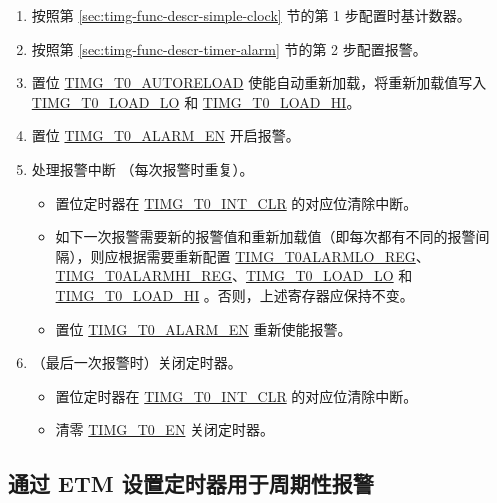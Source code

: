 \documentclass[main\_\_CN.tex]{subfiles}
\begin{document}
\begin{enumerate}
    \item 按照第 \ref{sec:timg-func-descr-simple-clock} 节的第 1 步配置时基计数器。
    \item 按照第 \ref{sec:timg-func-descr-timer-alarm} 节的第 2 步配置报警。
    \item 置位 \hyperref[fielddesc:TIMGTXAUTORELOAD]{TIMG\_T0\_AUTORELOAD} 使能自动重新加载，将重新加载值写入 \hyperref[fielddesc:TIMGTXLOADLO]{TIMG\_T0\_LOAD\_LO} 和 \hyperref[fielddesc:TIMGTXLOADHI]{TIMG\_T0\_LOAD\_HI}。
    \item 置位 \hyperref[fielddesc:TIMGTXALARMEN]{TIMG\_T0\_ALARM\_EN} 开启报警。
    \item 处理报警中断 （每次报警时重复）。
    \begin{itemize}
        \item 置位定时器在 \hyperref[fielddesc:TIMGT0INTCLR]{TIMG\_T0\_INT\_CLR} 的对应位清除中断。
        \item 如下一次报警需要新的报警值和重新加载值（即每次都有不同的报警间隔），则应根据需要重新配置 \hyperref[regdesc:TIMGTXALARMLOREG]{TIMG\_T0ALARMLO\_REG}、\hyperref[regdesc:TIMGTXALARMHIREG]{TIMG\_T0ALARMHI\_REG}、\hyperref[fielddesc:TIMGTXLOADLO]{TIMG\_T0\_LOAD\_LO} 和 \hyperref[fielddesc:TIMGTXLOADHI]{TIMG\_T0\_LOAD\_HI} 。否则，上述寄存器应保持不变。
        \item 置位 \hyperref[fielddesc:TIMGTXALARMEN]{TIMG\_T0\_ALARM\_EN} 重新使能报警。
    \end{itemize}
    \item （最后一次报警时）关闭定时器。
    \begin{itemize}
        \item 置位定时器在 \hyperref[fielddesc:TIMGT0INTCLR]{TIMG\_T0\_INT\_CLR} 的对应位清除中断。
        \item 清零 \hyperref[fielddesc:TIMGTXEN]{TIMG\_T0\_EN} 关闭定时器。
    \end{itemize}
\end{enumerate}

\subsection{通过 ETM 设置定时器用于周期性报警} \label{sec:timg-conf-etm}
\end{document}
